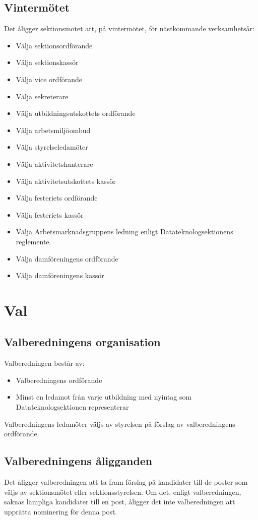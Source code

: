 \documentclass{datateknologsektionen-document}
\begin{document}
    \subsection{Vintermötet}
      Det åligger sektionsmötet att, på vintermötet, för nästkommande verksamhetsår:
      \begin{itemize}
        \item Välja sektionsordförande
        \item Välja sektionskassör
        \item Välja vice ordförande
        \item Välja sekreterare
        \item Välja utbildningsutskottets ordförande
        \item Välja arbetsmiljöombud
        \item Välja styrelseledamöter
	\item Välja aktivitetshanterare
	\item Välja aktivitetsutskottets kassör
        \item Välja festeriets ordförande
        \item Välja festeriets kassör
        \item Välja Arbetsmarknadsgruppens ledning enligt Datateknologsektionens reglemente.
        \item Välja damföreningens ordförande
        \item Välja damföreningens kassör 
      \end{itemize}

  \section{Val}
    \subsection{Valberedningens organisation}
      Valberedningen består av:
      \begin{itemize}
        \item Valberedningens ordförande
        \item Minst en ledamot från varje utbildning med nyintag som Datateknologsektionen representerar
      \end{itemize}
      Valberedningens ledamöter väljs av styrelsen på förslag av valberedningens ordförande.
    \subsection{Valberedningens åligganden}
      Det åligger valberedningen att ta fram förslag på kandidater till de poster som väljs av
      sektionsmötet eller sektionsstyrelsen. Om det, enligt valberedningen, saknas lämpliga
      kandidater till en post, åligger det inte valberedningen att upprätta nominering för denna
      post.
\end{document}
